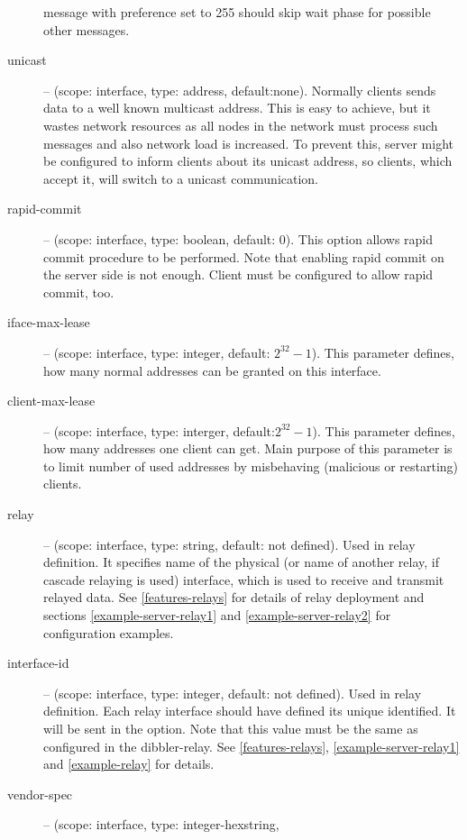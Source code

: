\begin{description}
	    message with preference set to 255 should skip wait phase
	    for possible other  messages.
 \item[unicast] -- (scope: interface, type: address,
	    default:none). Normally clients sends data to a well known
	    multicast address. This is easy to achieve, but it wastes
	    network resources as all nodes in the network must process
	    such messages and also network load is increased. To prevent
	    this, server might be configured to inform clients about its
	    unicast address, so clients, which accept it, will switch to
	    a unicast communication.
 \item[rapid-commit] -- (scope: interface, type: boolean, default:
            0). This option allows rapid commit procedure to be
            performed. Note that enabling rapid commit on the server
            side is not enough. Client must be configured to allow
	    rapid commit, too.
\item[iface-max-lease] -- (scope: interface, type: integer, default:
            $2^{32}-1$). This parameter defines, how many normal
            addresses can be granted on this interface.
\item[client-max-lease] -- (scope: interface, type: interger,
            default:$2^{32}-1$). This parameter defines, how many
            addresses one client can get. Main purpose of this
            parameter is to limit number of used addresses by
            misbehaving (malicious or restarting) clients.
\item[relay] -- (scope: interface, type: string, default: not
            defined). Used in relay definition.
            It specifies name of the physical (or name of
            another relay, if cascade relaying is used) interface,
            which is used to receive and transmit relayed data. See
            \ref{features-relays} for details of relay deployment and
            sections \ref{example-server-relay1} and
            \ref{example-server-relay2} for configuration examples. 
\item[interface-id] -- (scope: interface, type: integer, default: not
            defined). Used in relay definition. Each relay interface
            should have defined its unique identified. It will be sent
            in the  option. Note that this value
            must be the same as configured in the dibbler-relay. See
            \ref{features-relays}, \ref{example-server-relay1} and
            \ref{example-relay} for details.
 \item[vendor-spec] -- (scope: interface, type: integer-hexstring,

\end{description}
